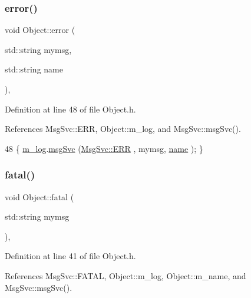 \subsubsection{\texorpdfstring{error()}{error()}\hspace{0.1cm}{\footnotesize\ttfamily [2/2]}}
{\footnotesize\ttfamily void Object\+::error (\begin{DoxyParamCaption}\item[{std\+::string}]{mymsg,  }\item[{std\+::string}]{name }\end{DoxyParamCaption})\hspace{0.3cm}{\ttfamily [inline]}, {\ttfamily [inherited]}}



Definition at line 48 of file Object.\+h.



References Msg\+Svc\+::\+E\+RR, Object\+::m\+\_\+log, and Msg\+Svc\+::msg\+Svc().


\begin{DoxyCode}
48 \{ \hyperlink{classObject_a0d269813dd7ac1f24bc143031e2963f2}{m\_log}.\hyperlink{classMsgSvc_ad25f18047920cc59a314e5098259711c}{msgSvc} (\hyperlink{classMsgSvc_ae671eb7301996cd049d2da8a65925926a35a9d7166e9896af4ec8fb33bf5f1772}{MsgSvc::ERR}     , mymsg, \hyperlink{classObject_a300f4c05dd468c7bb8b3c968868443c1}{name} ); \}
\end{DoxyCode}
\mbox{\label{classObject_aad5a16aac7516ce65bd5ec02ab07fc80}} 
\subsubsection{\texorpdfstring{fatal()}{fatal()}\hspace{0.1cm}{\footnotesize\ttfamily [1/2]}}
{\footnotesize\ttfamily void Object\+::fatal (\begin{DoxyParamCaption}\item[{std\+::string}]{mymsg }\end{DoxyParamCaption})\hspace{0.3cm}{\ttfamily [inline]}, {\ttfamily [inherited]}}



Definition at line 41 of file Object.\+h.



References Msg\+Svc\+::\+F\+A\+T\+AL, Object\+::m\+\_\+log, Object\+::m\+\_\+name, and Msg\+Svc\+::msg\+Svc().



